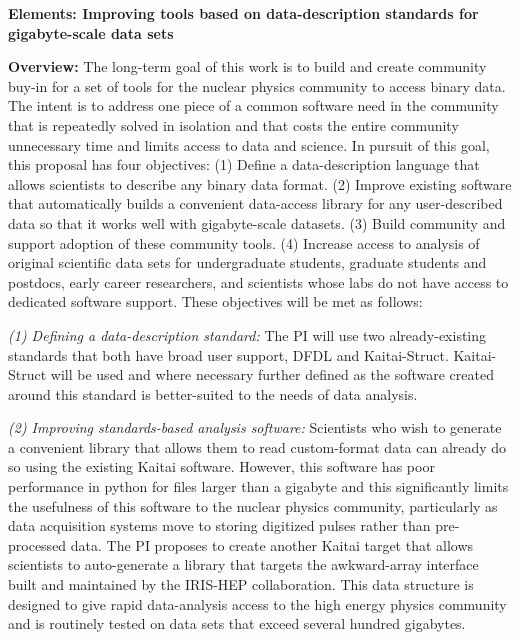 

\begin{center}
{\large{\bf Elements: Improving tools based on data-description standards for gigabyte-scale data sets}}
\end{center}

{\bf Overview:} The long-term goal of this work is to build and create community buy-in for a set of tools for the nuclear physics community to access binary data.  The intent is to address one piece of a common software need in the community that is repeatedly solved in isolation and that costs the entire community unnecessary time and limits access to data and science. In pursuit of this goal, this proposal has four objectives:  
(1) Define a data-description language that allows scientists to describe any binary data format.
(2) Improve existing software that automatically builds a convenient data-access library for any user-described data so that it works well with gigabyte-scale datasets.
(3) Build community and support adoption of these community tools.
(4) Increase access to analysis of original scientific data sets for undergraduate students, graduate students and postdocs, early career researchers, and scientists whose labs do not have access to dedicated software support. 
These objectives will be met as follows:

{\it (1) Defining a data-description standard:} The PI will use two already-existing standards that both have broad user support, DFDL and Kaitai-Struct.  Kaitai-Struct will be used and where necessary further defined as the software created around this standard is better-suited to the needs of data analysis.

{\it (2) Improving standards-based analysis software:} Scientists who wish to generate a convenient library that allows them to read custom-format data can already do so using the existing Kaitai software.  However, this software has poor performance in python for files larger than a gigabyte and this significantly limits the usefulness of this software to the nuclear physics community, particularly as data acquisition systems move to storing digitized pulses rather than pre-processed data.  The PI proposes to create another Kaitai target that allows scientists to auto-generate a library that targets the awkward-array interface built and maintained by the IRIS-HEP collaboration.  This data structure is designed to give rapid data-analysis access to the high energy physics community and is routinely tested on data sets that exceed several hundred gigabytes.

